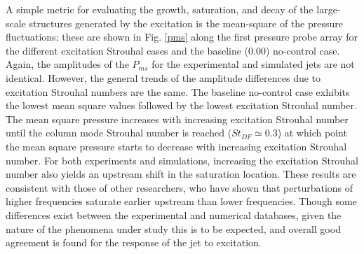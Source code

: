 \documentclass[english]{aiaa-tc}
\begin{document}

A simple metric for evaluating the growth, saturation, and decay of the large-scale structures generated by the excitation is the mean-square of the pressure fluctuations; these are shown in Fig. \ref{pms} along the first pressure probe array for the different excitation Strouhal cases and the baseline (0.00) no-control case. Again, the amplitudes of the $P_{ms}$ for the experimental and simulated jets are not identical. However, the general trends of the amplitude differences due to excitation Strouhal numbers are the same. The baseline no-control case exhibits the lowest mean square values followed by the lowest excitation Strouhal number. The mean square pressure increases with increasing excitation Strouhal number until the column mode Strouhal number is reached ($St_{DF} \simeq 0.3$) at which point the mean square pressure starts to decrease with increasing excitation Strouhal number. For both experiments and simulations, increasing the excitation Strouhal number also yields an upstream shift in the saturation location. These results are consistent with those of other researchers, who have shown that perturbations of higher frequencies saturate earlier upstream than lower frequencies\cite{Suzuki2006,Ukeiley2004}. Though some differences exist between the experimental and numerical databases, given the nature of the phenomena under study this is to be expected, and overall good agreement is found for the response of the jet to excitation. 
 
\end{document}
